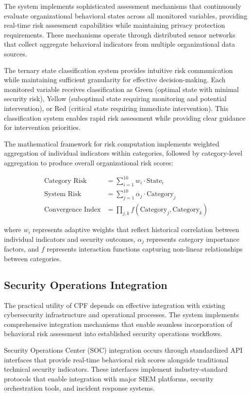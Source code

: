 \documentclass[journal]{IEEEtran}
\begin{document}
The system implements sophisticated assessment mechanisms that continuously evaluate organizational behavioral states across all monitored variables, providing real-time risk assessment capabilities while maintaining privacy protection requirements. These mechanisms operate through distributed sensor networks that collect aggregate behavioral indicators from multiple organizational data sources.

The ternary state classification system provides intuitive risk communication while maintaining sufficient granularity for effective decision-making. Each monitored variable receives classification as Green (optimal state with minimal security risk), Yellow (suboptimal state requiring monitoring and potential intervention), or Red (critical state requiring immediate intervention). This classification system enables rapid risk assessment while providing clear guidance for intervention priorities.

The mathematical framework for risk computation implements weighted aggregation of individual indicators within categories, followed by category-level aggregation to produce overall organizational risk scores:

\begin{align}
\text{Category Risk} &= \sum_{i=1}^{10} w_i \cdot \text{State}_i \\
\text{System Risk} &= \sum_{j=1}^{10} \alpha_j \cdot \text{Category}_j \\
\text{Convergence Index} &= \prod_{j,k} f(\text{Category}_j, \text{Category}_k)
\end{align}

where $w_i$ represents adaptive weights that reflect historical correlation between individual indicators and security outcomes, $\alpha_j$ represents category importance factors, and $f$ represents interaction functions capturing non-linear relationships between categories.

\subsection{Security Operations Integration}

The practical utility of CPF depends on effective integration with existing cybersecurity infrastructure and operational processes. The system implements comprehensive integration mechanisms that enable seamless incorporation of behavioral risk assessment into established security operations workflows.

Security Operations Center (SOC) integration occurs through standardized API interfaces that provide real-time behavioral risk scores alongside traditional technical security indicators. These interfaces implement industry-standard protocols that enable integration with major SIEM platforms, security orchestration tools, and incident response systems.
\end{document}
